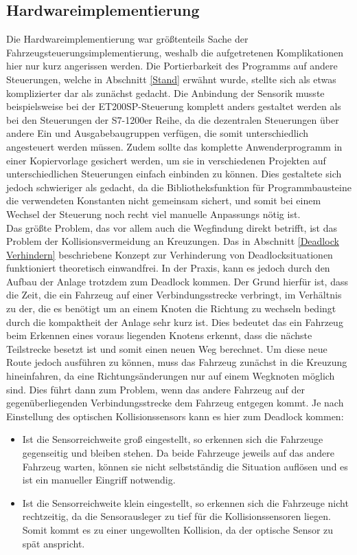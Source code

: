 	\subsection{Hardwareimplementierung}
		\label{Probleme_Hardware}
		Die Hardwareimplementierung war größtenteils Sache der Fahrzeugsteuerungsimplementierung, weshalb die aufgetretenen Komplikationen hier nur kurz angerissen werden. Die Portierbarkeit des Programms auf andere Steuerungen, welche in Abschnitt \ref{Stand} erwähnt wurde, stellte sich als etwas komplizierter dar als zunächst gedacht. Die Anbindung der Sensorik musste beispielsweise bei der ET200SP-Steuerung komplett anders gestaltet werden als bei den Steuerungen der S7-1200er Reihe, da die dezentralen Steuerungen über andere Ein und Ausgabebaugruppen verfügen, die somit unterschiedlich angesteuert werden müssen. Zudem sollte das komplette Anwenderprogramm in einer Kopiervorlage gesichert werden, um sie in verschiedenen Projekten auf unterschiedlichen Steuerungen einfach einbinden zu können. Dies gestaltete sich jedoch schwieriger als gedacht, da die Bibliotheksfunktion für Programmbausteine die verwendeten Konstanten nicht gemeinsam sichert, und somit bei einem Wechsel der Steuerung noch recht viel manuelle Anpassungs nötig ist.
		\\
		Das größte Problem, das vor allem auch die Wegfindung direkt betrifft, ist das Problem der Kollisionsvermeidung an Kreuzungen. Das in Abschnitt \ref{Deadlock Verhindern} beschriebene Konzept zur Verhinderung von Deadlocksituationen funktioniert theoretisch einwandfrei. In der Praxis, kann es jedoch durch den Aufbau der Anlage trotzdem zum Deadlock kommen. Der Grund hierfür ist, dass die Zeit, die ein Fahrzeug auf einer Verbindungsstrecke verbringt, im Verhältnis zu der, die es benötigt um an einem Knoten die Richtung zu wechseln bedingt durch die kompaktheit der Anlage sehr kurz ist. Dies bedeutet das ein Fahrzeug beim Erkennen eines voraus liegenden Knotens erkennt, dass die nächste Teilstrecke besetzt ist und somit einen neuen Weg berechnet. Um diese neue Route jedoch ausführen zu können, muss das Fahrzeug zunächst in die Kreuzung hineinfahren, da eine Richtungsänderungen nur auf einem Wegknoten möglich sind. Dies führt dann zum Problem, wenn das andere Fahrzeug auf der gegenüberliegenden Verbindungsstrecke dem Fahrzeug entgegen kommt. Je nach Einstellung des optischen Kollisionssensors kann es hier zum Deadlock kommen:
		\begin{itemize}
			\item Ist die Sensorreichweite groß eingestellt, so erkennen sich die Fahrzeuge gegenseitig und bleiben stehen. Da beide Fahrzeuge jeweils auf das andere Fahrzeug warten, können sie nicht selbstständig die Situation auflösen und es ist ein manueller Eingriff notwendig.
			\item Ist die Sensorreichweite klein eingestellt, so erkennen sich die Fahrzeuge nicht rechtzeitig, da die Sensorausleger zu tief für die Kollisionssensoren liegen. Somit kommt es zu einer ungewollten Kollision, da der optische Sensor zu spät anspricht.
		\end{itemize}
